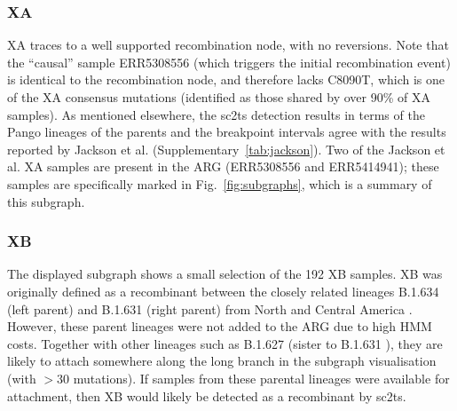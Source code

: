 \documentclass[12pt]{article}
\newcommand{\figref}[1]{Fig.~\ref{#1}}
\newcommand{\siref}[1]{Supplementary~\ref{#1}}
\begin{document}
\subsubsection{XA}
\label{sec:dd_xa}
XA traces to a well supported recombination node, with no reversions.
Note that the ``causal'' sample ERR5308556
(which triggers the initial recombination event)
is identical to the recombination node, and
therefore lacks C8090T,
which is one of the XA consensus mutations
(identified as those shared by over 90\% of XA samples).
As mentioned elsewhere,
the sc2ts detection results in terms of
the Pango lineages of the parents and the breakpoint intervals
agree with the results reported by Jackson et al. (\siref{tab:jackson}).
Two of the Jackson et al. XA samples
are present in the ARG (ERR5308556 and ERR5414941);
these samples are specifically marked in \figref{fig:subgraphs},
which is a summary of this subgraph.

\subsubsection{XB}
\label{sec:dd_xb}

The displayed subgraph shows a small selection of the 192 XB samples.
XB was originally defined as a recombinant between
the closely related lineages B.1.634 (left parent) and B.1.631 (right parent)
from North and Central America \cite{Gutierrez2022}.
However, these parent lineages were not added to the ARG due to high HMM costs.
Together with other lineages such as B.1.627
(sister to B.1.631 \cite{Gutierrez2022}),
they are likely to attach somewhere along the long branch
in the subgraph visualisation (with $> 30$ mutations).
If samples from these parental lineages were available for attachment,
then XB would likely be detected as a recombinant by sc2ts.

\end{document}
